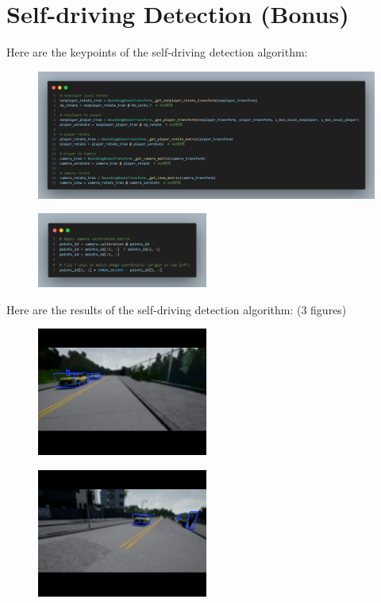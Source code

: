 \documentclass[]{article}
\begin{document}
\newpage
\section{Self-driving Detection (Bonus)}
Here are the keypoints of the self-driving detection algorithm:
\begin{figure}[h]
	\centering
	\includegraphics[width=1.0\textwidth]{pre1.png}
	\caption{}
	\label{fig:self_driving_keypoints}
\end{figure}
\begin{figure}[h]
	\centering
	\includegraphics[width=0.5\textwidth]{pre2.png}
	\caption{}
	\label{fig:self_driving_3d_keypoints}
\end{figure}
\newpage
Here are the results of the self-driving detection algorithm: (3 figures)
\begin{figure}[h]
	\centering
	\includegraphics[width=0.5\textwidth]{src/problem3_driving/output/test_0.png}
	\caption{}
	\label{fig:self_driving_results_1}
\end{figure}
\begin{figure}[h]
	\centering
	\includegraphics[width=0.5\textwidth]{src/problem3_driving/output/test_1.png}
	\caption{}
	\label{fig:self_driving_results_2}
\end{figure}
\end{document}
